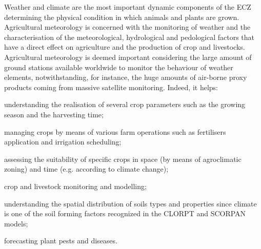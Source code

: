 \documentclass[authoryear,preprint,review,12pt]{elsarticle}
\newcommand{\note}[1]{\emph{\textcolor{red}{#1}}}
\begin{document}

Weather and climate are the most important dynamic components of the ECZ determining the physical condition in which animals and plants are grown.
Agricultural meteorology is concerned with the monitoring of weather and the characterisation of the meteorological, hydrological and pedological factors that have a direct effect on agriculture and the production of crop and livestocks.
Agricultural meteorology is deemed important considering the large amount of ground stations available worldwide to monitor the behaviour of weather elements, notwithstanding, for instance, the huge amounts of air-borne proxy products coming from massive satellite monitoring.
Indeed, it helps: %
    \begin{enumerate*}
        \item understanding the realisation of several crop parameters such as the growing season and the harvesting time;  %
        \item managing crops by means of various farm operations such as fertilisers application and irrigation scheduling;
        \item assessing the suitability of specific crops in space (by means of agroclimatic zoning) and time (e.g. according to climate change);
        \item crop and livestock monitoring and modelling;
        \item understanding the spatial distribution of soils types and properties since climate is one of the soil forming factors recognized in the CLORPT \citep{jenny:clorpt:1941} and SCORPAN \citep{McBratney:scorpan:2003} models;
        \item forecasting plant pests and diseases.
    \end{enumerate*}
\end{document}
